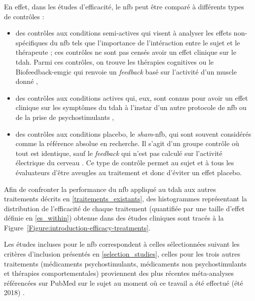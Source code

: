 En effet, dans les études d'efficacité, le \gls{nfb} peut être comparé à différents types de contrôles \citep{Arns2014} :
\begin{itemize}
\item des contrôles aux conditions semi-actives qui visent à analyser les effets non-spécifiques du \gls{nfb} tels que l'importance de l'intéraction entre le sujet et le thérapeute ; 
ces contrôles ne sont pas censés avoir un effet clinique sur le \gls{tdah}. Parmi ces contrôles, on trouve les thérapies cognitives ou le Biofeedback-\gls{emgic} qui renvoie un \textit{feedback} basé
sur l'activité d'un muscle donné \citep{Bakhshayesh2011},
\item des contrôles aux conditions actives qui, eux, sont connus pour avoir un effet clinique sur les symptômes du \gls{tdah} à l'instar d'un autre protocole de \gls{nfb} \citep{Leins2007} ou
de la prise de psychostimulants \citep{Meisel2014},
\item des contrôles aux conditions placebo, le \textit{sham}-\gls{nfb}, qui sont souvent considérés comme la référence absolue en recherche. Il s'agit d'un groupe contrôle
où tout est identique, sauf le \textit{feedback} qui n'est pas calculé sur l'activité électrique du cerveau \citep{Arnold2014}. Ce type de contrôle permet 
au sujet et à tous les évaluateurs d'être aveugles au traitement et donc d'éviter un effet placebo.
\end{itemize}

Afin de confronter la performance du \gls{nfb} appliqué au \gls{tdah} aux autres traitements décrits en \ref{traitements_existants}, des histogrammes
représentant la distribution de l'efficacité de chaque traitement (quantifiée par une taille d'effet définie en \ref{es_within}) obtenue dans des études cliniques
sont tracés à la Figure~\ref{Figure:introduction-efficacy-treatments}.

Les études incluses pour le \gls{nfb} correspondent à celles sélectionnées suivant les critères d'inclusion présentés en \ref{selection_studies}, celles pour les
trois autres traitements (médicaments psychostimulants, médicaments non psychostimulants et thérapies comportementales) proviennent des plus récentes méta-analyses 
référencées sur PubMed sur le sujet au moment où ce travail a été effectué (été 2018) \citep{Luan2017, Catala2017}.

